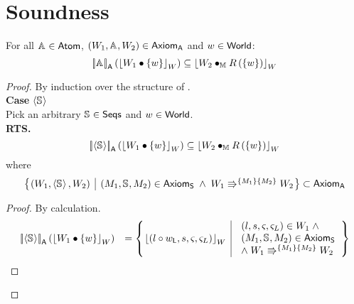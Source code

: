 \newpage
\section*{Soundness}
\begin{lemma}
For all $\mathbb{A}_{} \in \textsf{Atom}$, $\left(W_1, \mathbb{A}_{}, W_2\right) \in \textsf{Axiom}_{\textsf{A}}$ and $w \in \textsf{World}$:
%
\[
	\left[\!\left| \mathbb{A}_{} \right |\! \right]_{\textsf{A}}\left( \left\lfloor W_1 \bullet \{w\} \right\rfloor_{W} \right) \subseteq \left\lfloor W_2 \bullet_{\mathbb{M}} R\left(\{w\}\right) \right\rfloor_{W}
\]
%
\begin{proof}
By induction over the structure of \atom{}.\\

\noindent\textbf{Case \hspace*{0.3cm}}$\left\langle \mathbb{S}_{} \right\rangle$\\
Pick an arbitrary $\mathbb{S}_{} \in \textsf{Seqs}$ and $w \in \textsf{World}$.\\
\textbf{RTS.}
%
\[
	\left[\!\left| \left\langle \mathbb{S}_{} \right\rangle \right |\! \right]_{\textsf{A}}\left( \left\lfloor W_1 \bullet \{w\} \right\rfloor_{W} \right) \subseteq \left\lfloor W_2 \bullet_{\mathbb{M}} R\left(\{w\}\right) \right\rfloor_{W}
\]
%
where
%
\begin{align}
	\left\{
	\hspace*{-0.15cm}
	\begin{array}{l | l}
		 \left(W_1, \atomic{\seq{}}, W_2 \right) &
		 (\Hp{1}, \seq{}, \Hp{2}) \in \AxiomsSeq \;\land\; \repartitions{W_1}{W_2}{\Hp{1}}{\Hp{2}}
	\end{array}
	\hspace*{-0.15cm}
	\right\}
	\subset \AxiomsA
	\nonumber
\end{align}
%
\begin{proof}
By calculation.\\
%
\[
\begin{array}{r l}
	\opSemA{\atomic{\seq{}}}{\reifyW{W_1 \composeW \{w\}}} &
	= 
	\left\{
	\hspace*{-0.15cm}
	\begin{array}{l | l}
		\reifyW{\left(l \composeL \localPart{w}, s, \amod{}, \amod{L} \right)}
		&
		\begin{array}{l}
			(l, s, \amod{}, \amod{L}) \in W_1 \;\land\\ 
			(\Hp{1}, \seq{}, \Hp{2}) \in \AxiomsSeq \\
			\land\;\repartitions{W_1}{W_2}{\Hp{1}}{\Hp{2}}
		\end{array}			
	\end{array}
	\hspace*{-0.15cm}
	\right\}\\
	


\end{array}\]
\end{proof}
\end{proof}
\end{lemma}
